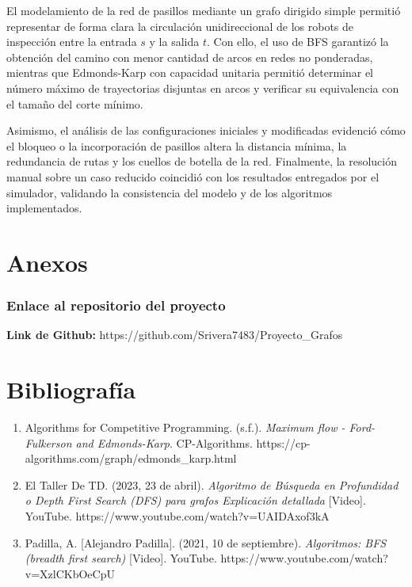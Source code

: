 \documentclass[12pt,a4paper]{article}
\providecommand{\tightlist}{\setlength{\itemsep}{0pt}\setlength{\parskip}{0pt}}
\begin{document}
El modelamiento de la red de pasillos mediante un grafo dirigido simple permitió representar de forma clara la circulación unidireccional de los robots de inspección entre la entrada \(s\) y la salida \(t\). Con ello, el uso de BFS garantizó la obtención del camino con menor cantidad de arcos en redes no ponderadas, mientras que Edmonds-Karp con capacidad unitaria permitió determinar el número máximo de trayectorias disjuntas en arcos y verificar su equivalencia con el tamaño del corte mínimo.

Asimismo, el análisis de las configuraciones iniciales y modificadas evidenció cómo el bloqueo o la incorporación de pasillos altera la distancia mínima, la redundancia de rutas y los cuellos de botella de la red. Finalmente, la resolución manual sobre un caso reducido coincidió con los resultados entregados por el simulador, validando la consistencia del modelo y de los algoritmos implementados.

\section{Anexos}\label{anexos}

\subsubsection{Enlace al repositorio del proyecto}\label{enlace-al-repositorio-del-proyecto}

\textbf{Link de Github:} https://github.com/Srivera7483/Proyecto\_Grafos

\section{Bibliografía}\label{bibliografuxeda}

\begin{enumerate}
\def\labelenumi{\arabic{enumi}.}
\tightlist
\item
  Algorithms for Competitive Programming. (s.f.). \emph{Maximum flow - Ford-Fulkerson and Edmonds-Karp}. CP-Algorithms. https://cp-algorithms.com/graph/edmonds\_karp.html
\item
  El Taller De TD. (2023, 23 de abril). \emph{Algoritmo de Búsqueda en Profundidad o Depth First Search (DFS) para grafos \textbar{} Explicación detallada} {[}Video{]}. YouTube. https://www.youtube.com/watch?v=UAIDAxof3kA
\item
  Padilla, A. {[}Alejandro Padilla{]}. (2021, 10 de septiembre). \emph{Algoritmos: BFS (breadth first search)} {[}Video{]}. YouTube. https://www.youtube.com/watch?v=XzlCKbOeCpU
\end{enumerate}
\end{document}
